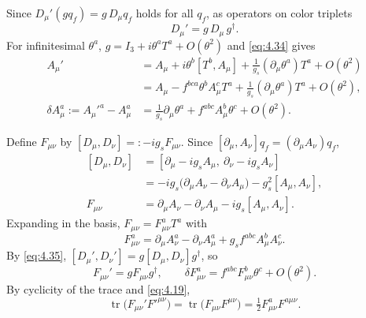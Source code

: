 \documentclass[11pt,a4paper]{article}
\newcommand{\topic}[1]{\par\addvspace{\medskipamount}\noindent{\bfseries\boldmath #1}\par\nopagebreak}
\begin{document}
Since $D_\mu'(gq_f)=g\,D_\mu q_f$ holds for all $q_f$, as operators on color triplets
\begin{equation*}
D_\mu'=g\,D_\mu\,g^\dagger.
\tag{4.35}\label{eq:4.35}
\end{equation*}
For infinitesimal $\theta^a$, $g=I_3+i\theta^aT^a+O(\theta^2)$ and \eqref{eq:4.34} gives
\begin{equation*}
\begin{aligned}
A_\mu'&=A_\mu+i\theta^b[T^b,A_\mu]+\frac1{g_s}(\partial_\mu\theta^a)T^a+O(\theta^2)\\
&=A_\mu-f^{bca}\theta^bA^c_\mu T^a+\frac1{g_s}(\partial_\mu\theta^a)T^a+O(\theta^2),\\[6pt]
\delta A^a_\mu:=A_\mu'^a-A_\mu^a
&=\frac1{g_s}\partial_\mu\theta^a+f^{abc}A^b_\mu\theta^c+O(\theta^2).
\end{aligned}
\tag{4.36}\label{eq:4.36}
\end{equation*}

\bigskip

\topic{Field Strength}

Define $F_{\mu\nu}$ by $[D_\mu,D_\nu]=:-ig_sF_{\mu\nu}$. Since $[\partial_\mu,A_\nu]q_f=(\partial_\mu A_\nu)q_f$,
\begin{equation*}
\begin{aligned}
{}[D_\mu,D_\nu]
&=[\partial_\mu-ig_sA_\mu,\ \partial_\nu-ig_sA_\nu]\\
&=-ig_s\bigl(\partial_\mu A_\nu-\partial_\nu A_\mu\bigr)-g_s^2[A_\mu,A_\nu],\\[6pt]
F_{\mu\nu}&=\partial_\mu A_\nu-\partial_\nu A_\mu-ig_s[A_\mu,A_\nu].
\end{aligned}
\tag{4.37}\label{eq:4.37}
\end{equation*}
Expanding in the basis, $F_{\mu\nu}=F^a_{\mu\nu}T^a$ with
\begin{equation*}
\boxed{
F^a_{\mu\nu}=\partial_\mu A^a_\nu-\partial_\nu A^a_\mu+g_sf^{abc}A^b_\mu A^c_\nu.
}
\tag{4.38}\label{eq:4.38}
\end{equation*}
By \eqref{eq:4.35}, $[D_\mu',D_\nu']=g[D_\mu,D_\nu]g^\dagger$, so
\begin{equation*}
F_{\mu\nu}'=gF_{\mu\nu}g^\dagger,
\qquad
\delta F^a_{\mu\nu}=f^{abc}F^b_{\mu\nu}\theta^c+O(\theta^2).
\tag{4.39}\label{eq:4.39}
\end{equation*}
By cyclicity of the trace and \eqref{eq:4.19},
\begin{equation*}
\operatorname{tr}\bigl(F_{\mu\nu}'F'^{\mu\nu}\bigr)
=\operatorname{tr}\bigl(F_{\mu\nu}F^{\mu\nu}\bigr)
=\tfrac12F^a_{\mu\nu}F^{a\mu\nu}.
\tag{4.40}\label{eq:4.40}
\end{equation*}
\end{document}
